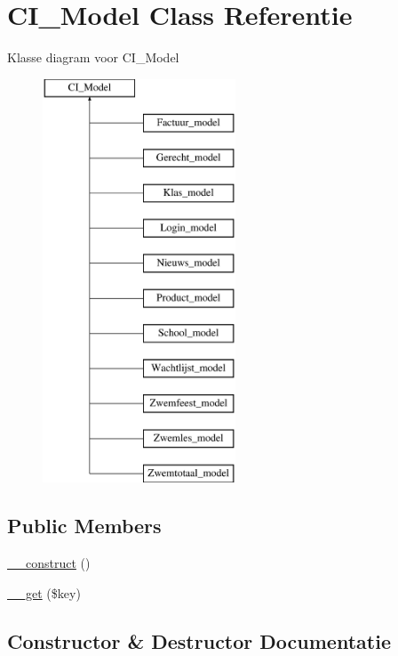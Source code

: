 \hypertarget{class_c_i___model}{}\section{C\+I\+\_\+\+Model Class Referentie}
\label{class_c_i___model}
Klasse diagram voor C\+I\+\_\+\+Model\begin{figure}[H]
\begin{center}
\leavevmode
\includegraphics[height=12.000000cm]{class_c_i___model}
\end{center}
\end{figure}
\subsection*{Public Members}
\begin{DoxyCompactItemize}
\item 
\mbox{\hyperlink{class_c_i___model_a095c5d389db211932136b53f25f39685}{\+\_\+\+\_\+construct}} ()
\item 
\mbox{\hyperlink{class_c_i___model_a4537dad3b44254124991341cc91b28fb}{\+\_\+\+\_\+get}} (\$key)
\end{DoxyCompactItemize}


\subsection{Constructor \& Destructor Documentatie}
\mbox{\label{class_c_i___model_a095c5d389db211932136b53f25f39685}} 
